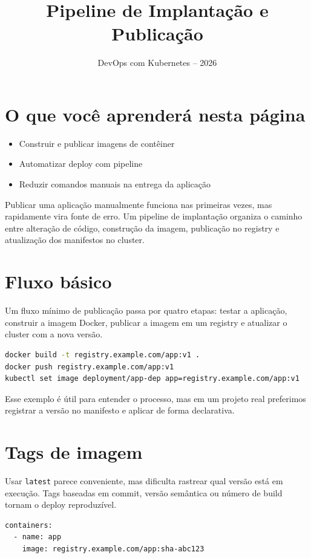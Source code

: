 \documentclass[11pt,a4paper]{article}
\title{\color{secondary}\Huge\textbf{Pipeline de Implantação e Publicação}}
\author{\color{primary}DevOps com Kubernetes -- 2026}
\date{}
\begin{document}
\maketitle


\section*{\color{primary}O que você aprenderá nesta página}
\begin{itemize}
\item Construir e publicar imagens de contêiner
\item Automatizar deploy com pipeline
\item Reduzir comandos manuais na entrega da aplicação
\end{itemize}

Publicar uma aplicação manualmente funciona nas primeiras vezes, mas rapidamente vira fonte de erro. Um pipeline de implantação organiza o caminho entre alteração de código, construção da imagem, publicação no registry e atualização dos manifestos no cluster.

\section*{\color{primary}Fluxo básico}

Um fluxo mínimo de publicação passa por quatro etapas: testar a aplicação, construir a imagem Docker, publicar a imagem em um registry e atualizar o cluster com a nova versão.

\begin{lstlisting}[language=bash]
docker build -t registry.example.com/app:v1 .
docker push registry.example.com/app:v1
kubectl set image deployment/app-dep app=registry.example.com/app:v1
\end{lstlisting}

Esse exemplo é útil para entender o processo, mas em um projeto real preferimos registrar a versão no manifesto e aplicar de forma declarativa.

\section*{\color{primary}Tags de imagem}

Usar \texttt{latest} parece conveniente, mas dificulta rastrear qual versão está em execução. Tags baseadas em commit, versão semântica ou número de build tornam o deploy reproduzível.

\begin{lstlisting}[language=bash]
containers:
  - name: app
    image: registry.example.com/app:sha-abc123
\end{lstlisting}
\end{document}
